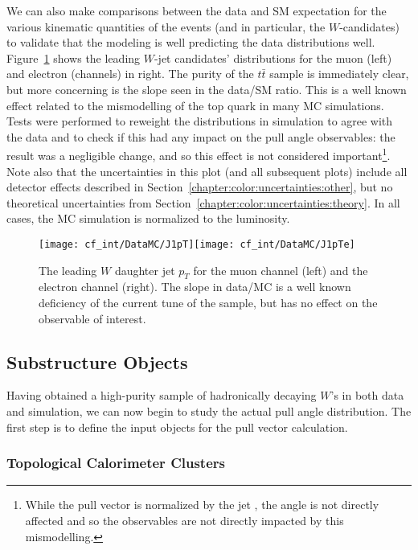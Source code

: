 We can also make comparisons between the data and SM expectation for the various kinematic quantities of the events (and in particular, the $W$-candidates) to validate that the modeling is well predicting the data distributions well. Figure~\ref{fig:color:yields:pts} shows the leading $W$-jet candidates' \pt distributions for the muon (left) and electron (channels) in right. The purity of the $t\bar{t}$ sample is immediately clear, but more concerning is the slope seen in the data/SM ratio. This is a well known effect related to the mismodelling of the top quark \pt in many MC simulations. Tests were performed to reweight the \pt distributions in simulation to agree with the data and to check if this had any impact on the pull angle observables: the result was a negligible change, and so this effect is not considered important\footnote{While the pull vector is normalized by the jet \pt, the angle is not directly affected and so the observables are not directly impacted by this mismodelling.}. Note also that the uncertainties in this plot (and all subsequent plots) include all detector effects described in Section~\ref{chapter:color:uncertainties:other}, but no theoretical uncertainties from Section~\ref{chapter:color:uncertainties:theory}. In all cases, the MC simulation is normalized to the luminosity.


\begin{figure}[h!]
\begin{center}
\texttt{[image: cf\_int/DataMC/J1pT]}\texttt{[image: cf\_int/DataMC/J1pTe]}
 \caption{The leading $W$ daughter jet $p_T$ for the muon channel (left) and the electron channel (right). The slope in data/MC is a well known deficiency of the current tune of the \PowPythia sample, but has no effect on the observable of interest. }
 \label{fig:color:yields:pts}
  \end{center}
\end{figure}



	\subsection{Substructure Objects}

Having obtained a high-purity sample of hadronically decaying $W$'s in both data and simulation, we can now begin to study the actual pull angle distribution. The first step is to define the input objects for the pull vector calculation.

	\subsubsection{Topological Calorimeter Clusters}

